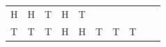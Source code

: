 {\begin{tabular}[t]{|l|l|l|l|l|l|l|l|l|l|}
        H &
        H &
        T &
        H &
        T%
     \tabularnewline\cline{1-1}\cline{2-2}\cline{3-3}\cline{4-4}\cline{5-5}\cline{6-6}\cline{7-7}\cline{8-8}\cline{9-9}\cline{10-10}
        T &
        T &
        T &
        H &
        H &
        T &
        T &
        T &

\end{tabular}}
